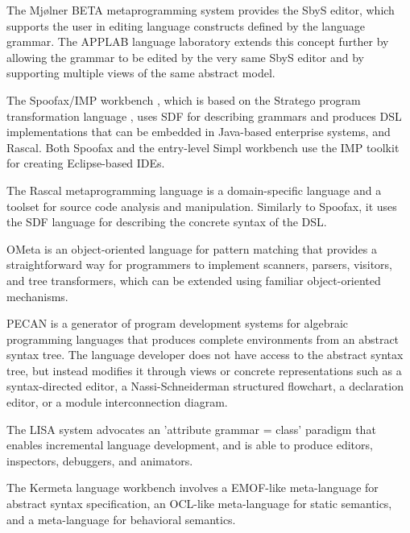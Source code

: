 \documentclass[preprint]{elsarticle}
\begin{document}
The Mj\o lner BETA metaprogramming system \cite{Machura1994} provides the SbyS editor, which supports the user in editing language constructs defined by the language grammar.
The APPLAB language laboratory \cite{Bjarnason1996} extends this concept further by allowing the grammar to be edited by the very same SbyS editor and by supporting multiple views of the same abstract model.

The Spoofax/IMP workbench \cite{Kats2010}, which is based on the Stratego program transformation language \cite{Bravenboer2008}, uses SDF for describing grammars and produces DSL implementations that can be embedded in Java-based enterprise systems, and Rascal.
Both Spoofax and the entry-level Simpl workbench \cite{Freudenthal2013} use the IMP toolkit for creating Eclipse-based IDEs.

The Rascal metaprogramming language \cite{Bos2011} is a domain-specific language and a toolset for source code analysis and manipulation.
Similarly to Spoofax, it uses the SDF language for describing the concrete syntax of the DSL.

OMeta \cite{Warth2007} is an object-oriented language for pattern matching that provides a straightforward way for programmers to implement scanners, parsers, visitors, and tree transformers, which can be extended using familiar object-oriented mechanisms.

PECAN \cite{Reiss1984} is a generator of program development systems for algebraic programming languages that produces complete environments from an abstract syntax tree.
The language developer does not have access to the abstract syntax tree, but instead modifies it through views or concrete representations such as a syntax-directed editor, a Nassi-Schneiderman structured flowchart, a declaration editor, or a module interconnection diagram.

The LISA system \cite{Henriques2005} advocates an 'attribute grammar = class' paradigm that enables incremental language development, and is able to produce editors, inspectors, debuggers, and animators.

The Kermeta language workbench \cite{Jezequel2013} involves a EMOF-like \cite{EMOF} meta-language for abstract syntax specification, an OCL-like \cite{OCL} meta-language for static semantics, and a meta-language for behavioral semantics.
\end{document}
